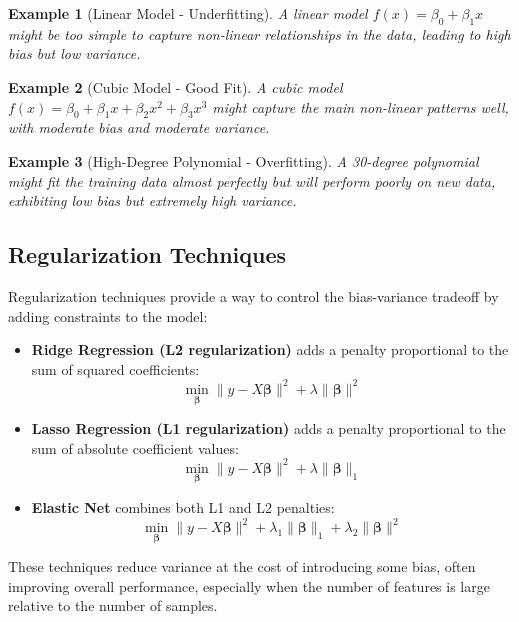 \documentclass{article}
\newtheorem{example}{Example}
\begin{document}
\begin{example}[Linear Model - Underfitting]
A linear model $f(x) = \beta_0 + \beta_1 x$ might be too simple to capture non-linear relationships in the data, leading to high bias but low variance.
\end{example}

\begin{example}[Cubic Model - Good Fit]
A cubic model $f(x) = \beta_0 + \beta_1 x + \beta_2 x^2 + \beta_3 x^3$ might capture the main non-linear patterns well, with moderate bias and moderate variance.
\end{example}

\begin{example}[High-Degree Polynomial - Overfitting]
A 30-degree polynomial might fit the training data almost perfectly but will perform poorly on new data, exhibiting low bias but extremely high variance.
\end{example}

\subsection{Regularization Techniques}

Regularization techniques provide a way to control the bias-variance tradeoff by adding constraints to the model:

\begin{itemize}
\item \textbf{Ridge Regression (L2 regularization)} adds a penalty proportional to the sum of squared coefficients:
\[
\min_{\boldsymbol{\beta}} \|y - X\boldsymbol{\beta}\|^2 + \lambda \|\boldsymbol{\beta}\|^2
\]

\item \textbf{Lasso Regression (L1 regularization)} adds a penalty proportional to the sum of absolute coefficient values:
\[
\min_{\boldsymbol{\beta}} \|y - X\boldsymbol{\beta}\|^2 + \lambda \|\boldsymbol{\beta}\|_1
\]

\item \textbf{Elastic Net} combines both L1 and L2 penalties:
\[
\min_{\boldsymbol{\beta}} \|y - X\boldsymbol{\beta}\|^2 + \lambda_1 \|\boldsymbol{\beta}\|_1 + \lambda_2 \|\boldsymbol{\beta}\|^2
\]
\end{itemize}

These techniques reduce variance at the cost of introducing some bias, often improving overall performance, especially when the number of features is large relative to the number of samples.
\end{document}
